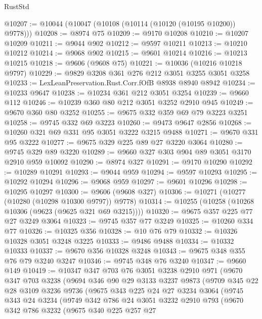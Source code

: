 \begin{lexlean}{RustStd}
\begin{coremodule}
@10207 := @10044 (@10047 (@10108 (@10114 (@10120 (@10195 @10200)) @9778)))
@10208 := @8974 @75
@10209 := @9170 @10208
@10210 := @10207 @10209
@10211 := @9044 @902
@10212 := @9597 @10211
@10213 := @10210 @10212
@10214 := @9068 @902
@10215 := @9601 @10214
@10216 := @10213 @10215
@10218 := @9606 (@9608 @75)
@10221 := @10036 (@10216 @10218 @9797)
@10229 := @9829 @3208 @361 @276 @212 @3051 @3255 @3051 @3258
@10233 := LexLeanPreservation.Rust.Corr.fOfB @8938 @8940 @8942
@10234 := @10233 @9647
@10238 := @10234 @361 @212 @3051 @3254
@10239 := @9660 @112
@10246 := @10239 @360 @80 @212 @3051 @3252 @2910 @945
@10249 := @9670 @360 @80 @3252
@10255 := @9675 @332 @359 @69 @79 @3223 @3251
@10258 := @9745 @332 @69 @3223
@10260 := @9473 @9647 @2856
@10268 := @10260 @321 @69 @331 @95 @3051 @3222 @3215 @9488
@10271 := @9670 @331 @95 @3222
@10277 := @9675 @329 @225 @89 @27 @3220 @3064
@10280 := @9745 @329 @89 @3220
@10289 := @9660 @327 @303 @904 @89 @3051 @3170 @2910 @959 @10092
@10290 := @8974 @327
@10291 := @9170 @10290
@10292 := @10289 @10291
@10293 := @9044 @959
@10294 := @9597 @10293
@10295 := @10292 @10294
@10296 := @9068 @959
@10297 := @9601 @10296
@10298 := @10295 @10297
@10300 := @9606 (@9608 @327)
@10306 := @10271 (@10277 (@10280 (@10298 @10300 @9797)) @9778)
@10314 := @10255 (@10258 (@10268 @10306 (@9623 (@9625 @321 @69 @3215))))
@10320 := @9675 @357 @225 @77 @27 @3249 @3064
@10323 := @9745 @357 @77 @3249
@10325 := @10260 @334 @77
@10326 := @10325 @356
@10328 := @10 @76 @79
@10332 := @10326 @10328 @3051 @3248 @3225
@10333 := @9486 @9488
@10334 := @10332 @10333
@10337 := @9670 @356 @10328 @3248
@10343 := @9675 @348 @355 @76 @79 @3240 @3247
@10346 := @9745 @348 @76 @3240
@10347 := @9660 @149
@10419 := @10347
    @347
    @703
    @76
    @3051
    @3238
    @2910
    @971
    (@9670
      @347
      @703
      @3238
      (@9694
        @346
        @90
        @29
        @3133
        @3237
        @9873
        (@9709
          @345
          @22
          @28
          @3109
          @3236
          @9736
          (@9675
            @343
            @225
            @24
            @27
            @3234
            @3064
            (@9745
              @343
              @24
              @3234
              (@9749
                @342
                @786
                @24
                @3051
                @3232
                @2910
                @793
                (@9670
                  @342
                  @786
                  @3232
                  (@9675
                    @340
                    @225
                    @257
                    @27

\end{coremodule}
\end{lexlean}
